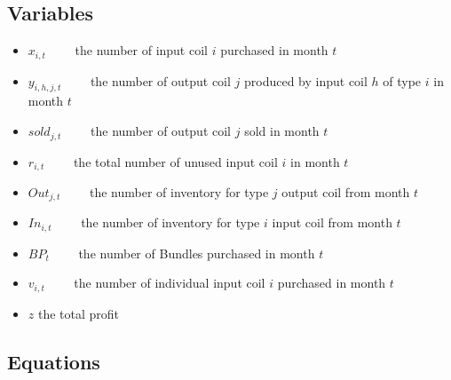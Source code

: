 \documentclass{article}[12pt]
\begin{document}
{\subsection{Variables} 

\begin{itemize}
\item $x_{i,t} \qquad$ the number of input coil $i$ purchased in month $t$ \\

\item $y_{i,h,j,t} \qquad$ the number of output coil $j$ produced by input coil $h$ of type $i$ in month $t$ \\

\item $sold_{j,t} \qquad$ the number of output coil $j$ sold in month $t$ \\

\item $r_{i,t} \qquad$ the total number of unused input coil $i$ in month $t$ \\ 

\item $Out_{j,t} \qquad$ the number of inventory for type $j$ output coil from month $t$ \\

\item $In_{i,t} \qquad$	the number of inventory for type $i$ input coil from month $t$ \\

\item $BP_{t} \qquad$	the number of Bundles purchased in month $t$ \\

\item $v_{i,t} \qquad$ the number of individual input coil $i$ purchased in month $t$ \\


\item $z$	the total profit \\

\end{itemize}

\subsection{Equations}

}
\end{document}
